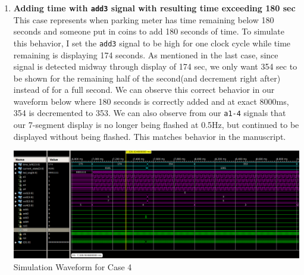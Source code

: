 \documentclass{article}
\begin{document}
\begin{enumerate}
    \item \textbf{Adding time with \texttt{add3} signal with resulting time exceeding 180 sec}  \\
    This case represents when parking meter has time remaining below 180 seconds and someone put in coins to add 180 seconds of time. To simulate this behavior, I set the \texttt{add3} signal to be high for one clock cycle while time remaining is displaying 174 seconds. As mentioned in the last case, since signal is detected midway through display of 174 sec, we only want 354 sec to be shown for the remaining half of the second(and decrement right after) instead of for a full second. We can observe this correct behavior in our waveform below where 180 seconds is correctly added and at exact 8000ms, 354 is decremented to 353. We can also observe from our \texttt{a1-4} signals that our 7-segment display is no longer being flashed at 0.5Hz, but continued to be displayed without being flashed. This matches behavior in the manuscript.
    \begin{center}
        \includegraphics[scale=0.30]{waveform-4.png} \\
        \caption{Simulation Waveform for Case 4}
    \end{center}


\end{enumerate}
\end{document}

